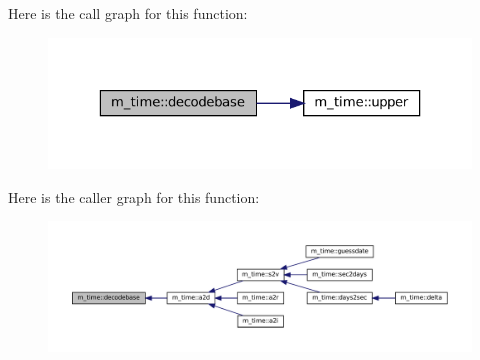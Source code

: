 Here is the call graph for this function\+:\nopagebreak
\begin{figure}[H]
\begin{center}
\leavevmode
\includegraphics[width=323pt]{namespacem__time_a8dacab5686d74326cc68aa91b6f16c2d_cgraph}
\end{center}
\end{figure}
Here is the caller graph for this function\+:\nopagebreak
\begin{figure}[H]
\begin{center}
\leavevmode
\includegraphics[width=350pt]{namespacem__time_a8dacab5686d74326cc68aa91b6f16c2d_icgraph}
\end{center}
\end{figure}
\mbox{\label{namespacem__time_aa623b1643e55ffbf97e4fbd1c7e8c379}} 
